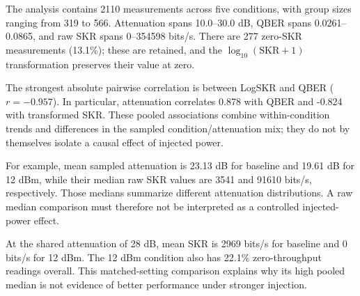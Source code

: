 The analysis contains 2110 measurements across five conditions, with group sizes ranging from 319 to 566. Attenuation spans 10.0--30.0 dB, QBER spans 0.0261--0.0865, and raw SKR spans 0--354598 bits/s. There are 277 zero-SKR measurements (13.1\%); these are retained, and the $\log_{10}(\mathrm{SKR}+1)$ transformation preserves their value at zero.

The strongest absolute pairwise correlation is between LogSKR and QBER ($r=-0.957$). In particular, attenuation correlates 0.878 with QBER and -0.824 with transformed SKR. These pooled associations combine within-condition trends and differences in the sampled condition/attenuation mix; they do not by themselves isolate a causal effect of injected power.

For example, mean sampled attenuation is 23.13 dB for baseline and 19.61 dB for 12 dBm, while their median raw SKR values are 3541 and 91610 bits/s, respectively. Those medians summarize different attenuation distributions. A raw median comparison must therefore not be interpreted as a controlled injected-power effect.


At the shared attenuation of 28 dB, mean SKR is 2969 bits/s for baseline and 0 bits/s for 12 dBm. The 12 dBm condition also has 22.1\% zero-throughput readings overall. This matched-setting comparison explains why its high pooled median is not evidence of better performance under stronger injection.
